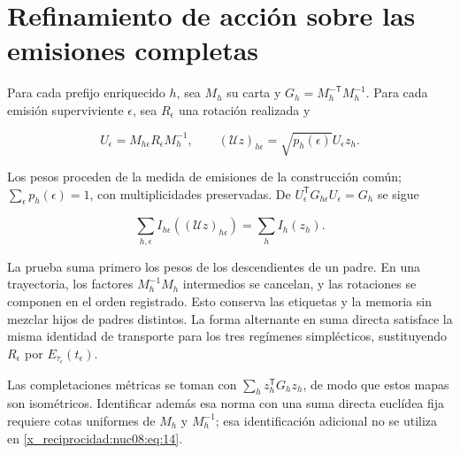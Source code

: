 \section{Refinamiento de acción sobre las emisiones completas}

Para cada prefijo enriquecido \(h\), sea \(M_h\) su carta y \(G_h=M_h^{-\mathsf T}M_h^{-1}\). Para cada emisión superviviente \(\epsilon\), sea \(R_\epsilon\) una rotación realizada y

\[
U_\epsilon=M_{h\epsilon}R_\epsilon M_h^{-1},\qquad
(\mathscr U z)_{h\epsilon}=\sqrt{p_h(\epsilon)}U_\epsilon z_h.
\]

Los pesos proceden de la medida de emisiones de la construcción común; \(\sum_\epsilon p_h(\epsilon)=1\), con multiplicidades preservadas. De \(U_\epsilon^\mathsf TG_{h\epsilon}U_\epsilon=G_h\) se sigue

\begin{equation}
\sum_{h,\epsilon}I_{h\epsilon}((\mathscr U z)_{h\epsilon})
=\sum_h I_h(z_h).
\label{x_reciprocidad:nuc08:eq:14}
\end{equation}

La prueba suma primero los pesos de los descendientes de un padre. En una trayectoria, los factores \(M_h^{-1}M_h\) intermedios se cancelan, y las rotaciones se componen en el orden registrado. Esto conserva las etiquetas y la memoria sin mezclar hijos de padres distintos. La forma alternante en suma directa satisface la misma identidad de transporte para los tres regímenes simplécticos, sustituyendo \(R_\epsilon\) por \(E_{\tau_\epsilon}(t_\epsilon)\).

Las completaciones métricas se toman con \(\sum_h z_h^\mathsf TG_hz_h\), de modo que estos mapas son isométricos. Identificar además esa norma con una suma directa euclídea fija requiere cotas uniformes de \(M_h\) y \(M_h^{-1}\); esa identificación adicional no se utiliza en \eqref{x_reciprocidad:nuc08:eq:14}.

